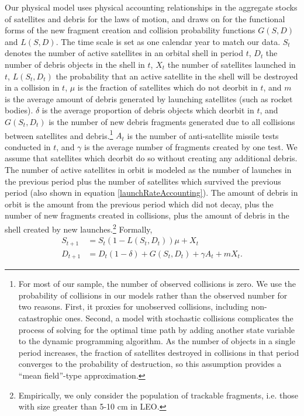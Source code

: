 \documentclass[9pt,twoside,lineno]{pnas-new}
\begin{document}
Our physical model uses physical accounting relationships in the aggregate stocks of satellites and debris for the laws of motion, and draws on \citep{letiziaetal2017} for the functional forms of the new fragment creation and collision probability functions $G(S,D)$ and $L(S,D)$. The time scale is set as one calendar year to match our data. $S_t$ denotes the number of active satellites in an orbital shell in period $t$, $D_t$ the number of debris objects in the shell in $t$, $X_t$ the number of satellites launched in $t$, $L(S_t,D_t)$ the probability that an active satellite in the shell will be destroyed in a collision in $t$, $\mu$ is the fraction of satellites which do not deorbit in $t$, and $m$ is the average amount of debris generated by launching satellites (such as rocket bodies). $\delta$ is the average proportion of debris objects which deorbit in $t$, and $G(S_t,D_t)$ is the number of new debris fragments generated due to all collisions between satellites and debris.\footnote{For most of our sample, the number of observed collisions is zero. We use the probability of collisions in our models rather than the observed number for two reasons. First, it proxies for unobserved collisions, including non-catastrophic ones. Second, a model with stochastic collisions complicates the process of solving for the optimal time path by adding another state variable to the dynamic programming algorithm. As the number of objects in a single period increases, the fraction of satellites destroyed in collisions in that period converges to the probability of destruction, so this assumption provides a ``mean field''-type approximation.} $A_t$ is the number of anti-satellite missile tests conducted in $t$, and $\gamma$ is the average number of fragments created by one test. We assume that satellites which deorbit do so without creating any additional debris. \\

The number of active satellites in orbit is modeled as the number of launches in the previous period plus the number of satellites which survived the previous period (also shown in equation \ref{launchRateAccounting}). The amount of debris in orbit is the amount from the previous period which did not decay, plus the number of new fragments created in collisions, plus the amount of debris in the shell created by new launches.\footnote{Empirically, we only consider the population of trackable fragments, i.e. those with size greater than 5-10 cm in LEO.} Formally,
\begin{align}
\label{satelliteLoM}
S_{t+1} &= S_t(1 - L(S_t,D_t))\mu + X_t \\
\label{debrisLoM}
D_{t+1} &= D_t(1-\delta) + G(S_t,D_t) + \gamma A_t + mX_t.
\end{align}
\end{document}
